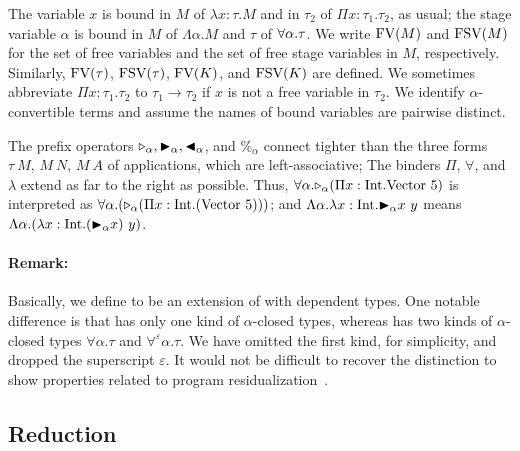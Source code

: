 The variable $x$ is bound in $M$ of $\lambda x:\tau.M$ and in $\tau_2$
of $\Pi x:\tau_1.\tau_2$, as usual; the stage variable $\alpha$ is
bound in $M$ of $\Lambda \alpha.M$ and $\tau$ of $\forall\alpha.\tau$.
We write $\text{FV}(M)$ and $\text{FSV}(M)$ for the set of free variables and the set of free stage variables in $M$, respectively.  Similarly, $\text{FV}(\tau)$, $\text{FSV}(\tau)$,
$\text{FV}(K)$, and $\text{FSV}(K)$ are defined.
We sometimes abbreviate $\Pi x:\tau_1.\tau_2$ to $\tau_1 \rightarrow \tau_2$ if
$x$ is not a free variable in $\tau_2$.
We identify $\alpha$-convertible terms and assume the names of bound variables are pairwise distinct.

The prefix operators ${\mathop{\triangleright}}_\alpha, {\mathop{\blacktriangleright}}_\alpha, {\mathop{\blacktriangleleft}}_\alpha$, and
$\%_\alpha$ connect tighter than the three forms $\tau\ M$, $M\ N$,
$M\ A$ of applications, which are left-associative; The binders $\Pi$,
$\forall$, and $\lambda$ extend as far to the right as possible.
Thus, $\F\alpha.\TW_{\alpha} (\Pi x:\I.\text{Vector}\ 5)$ is
interpreted as
$\F\alpha.(\TW_{\alpha} (\Pi x:\I.(\text{Vector}\ 5)))$; and
$\Lambda\alpha.\lambda x:\textrm{Int}.{\mathop{\blacktriangleright}}_\alpha x\ y$ means
$\Lambda\alpha.(\lambda x:\I.(\TB_\alpha x)\ y)$.

\paragraph{Remark:} Basically, we define \LMD to be an extension of
\LTP with dependent types.  One notable difference is that \LMD has
only one kind of \(\alpha\)-closed types, whereas \LTP has two kinds
of \(\alpha\)-closed types \(\forall\alpha.\tau\) and
\(\forall^\varepsilon\alpha.\tau\).  We have omitted the first kind,
for simplicity, and dropped the superscript $\varepsilon$.  It would
not be difficult to recover the distinction to show properties related
to program residualization~\cite{Hanada2014}.


\subsection{Reduction}

